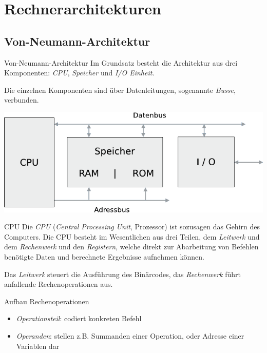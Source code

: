 \section{Rechnerarchitekturen}
\subsection{Von-Neumann-Architektur}

\begin{defi}{Von-Neumann-Architektur}
    Im Grundsatz besteht die Architektur aus drei Komponenten: \emph{CPU}, \emph{Speicher} und \emph{I/O Einheit}.

    Die einzelnen Komponenten sind über Datenleitungen, sogenannte \emph{Busse}, verbunden.
    \begin{center}
        \includegraphics[]{images/von_neumann.pdf}
    \end{center}
\end{defi}

\begin{defi}{CPU}
    Die \emph{CPU} (\emph{Central Processing Unit}, Prozessor) ist sozusagen das Gehirn des Computers.
    Die CPU besteht im Wesentlichen aus drei Teilen, dem \emph{Leitwerk} und
    dem \emph{Rechenwerk} und den \emph{Registern}, welche direkt zur Abarbeitung von Befehlen
    benötigte Daten und berechnete Ergebnisse aufnehmen können.

    Das \emph{Leitwerk} steuert die Ausführung des Binärcodes, das \emph{Rechenwerk} führt anfallende Rechenoperationen aus.
\end{defi}

\begin{bonus}{Aufbau Rechenoperationen}
    \begin{itemize}
        \item \emph{Operationsteil}: codiert konkreten Befehl
        \item \emph{Operanden}: stellen z.B. Summanden einer Operation, oder Adresse einer Variablen dar
    \end{itemize}
\end{bonus}

